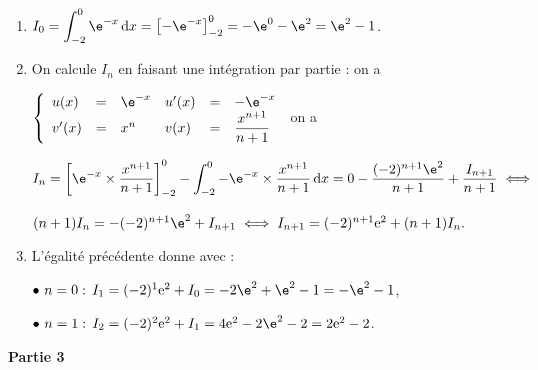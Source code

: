 \begin{enumerate}
\item %
$I_0 = \displaystyle\int_{-2}^0 \e^{-x}\, \text{d}x = \left[- \e^{-x}\right]_{-2}^0 = - \e^{0} - \e^{2} = \e^2 - 1$.
\item %
On calcule $I_n$ en faisant une intégration par partie : on a 

$\left\{\begin{array}{l c l l c l}
u(x) &=& \e^{-x}&u'(x) &=& - \e^{-x}\\
v'(x)&=&x^n&v(x) &=&\dfrac{x^{n+1}}{n+1}\\
\end{array}\right.$ on a 

$I_n = \left[\e^{-x} \times \dfrac{x^{n+1}}{n+1}\right]_{-2}^0
 - \displaystyle\int_{-2}^0 - \e^{-x} \times \dfrac{x^{n+1}}{n+1}\, \text{d}x = 0 - \dfrac{(-2)^{n+1}\e^{2}}{n + 1} + \dfrac{I_{n+1}}{n + 1} \iff $
 
 $(n + 1)I_n = -(- 2)^{n+1}\e^2 + I_{n+1} \iff I_{n+1} = (- 2)^{n+1} \text{e}^2 + (n + 1)I_n.$

\item%
L'égalité précédente donne avec :

$\bullet~n = 0 :\, I_{1} = (- 2)^{1}\text{e}^2 + I_0 = - 2\e^{2} + \e^{2} - 1 = -\e^{2} - 1$,

$\bullet~n = 1 :\, I_{2} = (- 2)^{2} \text{e}^2 + I_1 = 4 \text{e}^2  - 2\e^{2} - 2 = 2\text{e}^2 - 2$.
\end{enumerate}

\medskip

\textbf{Partie 3}

\medskip

